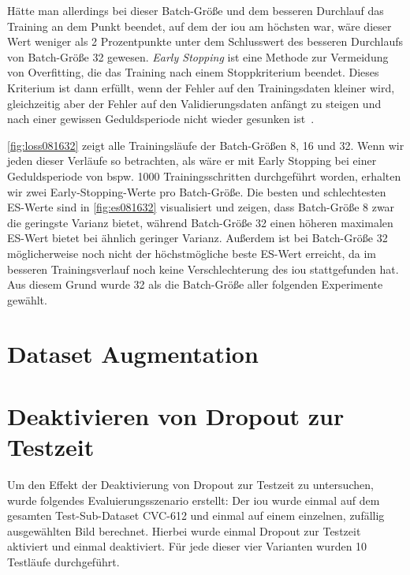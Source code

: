 

Hätte man allerdings bei dieser Batch-Größe und dem besseren Durchlauf das Training an dem Punkt beendet, auf dem der \gls{iou} am höchsten war, wäre dieser Wert weniger als 2 Prozentpunkte unter dem Schlusswert des besseren Durchlaufs von Batch-Größe 32 gewesen.
\emph{Early Stopping} ist eine Methode zur Vermeidung von Overfitting, die das Training nach einem Stoppkriterium beendet.
Dieses Kriterium ist dann erfüllt, wenn der Fehler auf den Trainingsdaten kleiner wird, gleichzeitig aber der Fehler auf den Validierungsdaten anfängt zu steigen und nach einer gewissen Geduldsperiode nicht wieder gesunken ist~\cite{Goodfellow.2016}.

\autoref{fig:loss081632} zeigt alle Trainingsläufe der Batch-Größen 8, 16 und 32.
Wenn wir jeden dieser Verläufe so betrachten, als wäre er mit Early Stopping bei einer Geduldsperiode von bspw. 1000 Trainingsschritten durchgeführt worden, erhalten wir zwei Early-Stopping-Werte pro Batch-Größe.
Die besten und schlechtesten ES-Werte sind in \autoref{fig:es081632} visualisiert und zeigen, dass Batch-Größe 8 zwar die geringste Varianz bietet, während Batch-Größe 32 einen höheren maximalen ES-Wert bietet bei ähnlich geringer Varianz.
Außerdem ist bei Batch-Größe 32 möglicherweise noch nicht der höchstmögliche beste ES-Wert erreicht, da im besseren Trainingsverlauf noch keine Verschlechterung des \gls{iou} stattgefunden hat.
Aus diesem Grund wurde 32 als die Batch-Größe aller folgenden Experimente gewählt.





\section{Dataset Augmentation}



\section{Deaktivieren von Dropout zur Testzeit}

Um den Effekt der Deaktivierung von Dropout zur Testzeit zu untersuchen, wurde folgendes Evaluierungsszenario erstellt:
Der \gls{iou} wurde einmal auf dem gesamten Test-Sub-Dataset CVC-612 und einmal auf einem einzelnen, zufällig ausgewählten Bild berechnet.
Hierbei wurde einmal Dropout zur Testzeit aktiviert und einmal deaktiviert.
Für jede dieser vier Varianten wurden 10 Testläufe durchgeführt.

